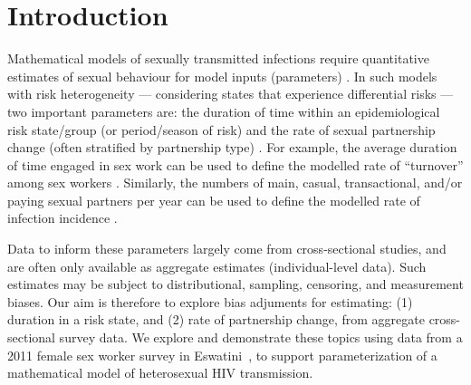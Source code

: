 \section{Introduction}
Mathematical models of sexually transmitted infections require
quantitative estimates of sexual behaviour for model inputs (parameters) \cite{Garnett2002}.
In such models with risk heterogeneity
--- \ie considering states that experience differential risks ---
two important parameters are:
the duration of time within an epidemiological risk state/group (or period/season of risk) and
the rate of sexual partnership change (often stratified by partnership type)
\cite{Garnett1996,Stigum1997,Watts2010,Knight2020}.
For example, the average duration of time engaged in sex work
can be used to define the modelled rate of ``turnover'' among sex workers \cite{Watts2010}.
Similarly, the numbers of main, casual, transactional, and/or paying sexual partners per year
can be used to define the modelled rate of infection incidence \cite{Boily2015}.
\par
Data to inform these parameters largely come from cross-sectional studies,
and are often only available as aggregate estimates (\vs individual-level data).
Such estimates may be subject to distributional, sampling, censoring, and measurement biases.
Our aim is therefore to explore bias adjuments for estimating:
(1) duration in a risk state, and (2) rate of partnership change,
from aggregate cross-sectional survey data.
We explore and demonstrate these topics using data from
a 2011 female sex worker survey in Eswatini~\cite{Baral2014},
to support parameterization of a mathematical model of heterosexual HIV transmission.
